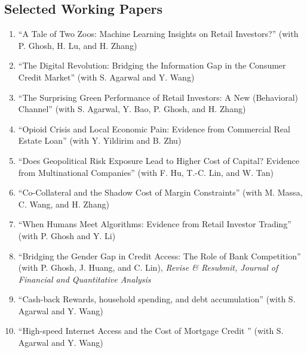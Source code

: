 \documentclass[margin,line]{res}
\begin{document}
\begin{resume}
\section{\sc Selected Working Papers}
\begin{enumerate}
\item ``A Tale of Two Zoos: Machine Learning Insights on Retail Investors?'' (with P. Ghosh, H. Lu, and H. Zhang)
\vspace*{0.1cm}

\item %
``The Digital Revolution: Bridging the Information Gap in the Consumer Credit Market'' (with S. Agarwal and Y. Wang)
\vspace*{0.1cm}

\item %
``The Surprising Green Performance of Retail Investors: A New (Behavioral) Channel'' (with S. Agarwal, Y. Bao, P. Ghosh, and H. Zhang)
\vspace*{0.1cm}
\item ``Opioid Crisis and Local Economic Pain: Evidence from Commercial Real Estate Loan'' (with Y. Yildirim and B. Zhu)
\vspace*{0.1cm}
\item %
``Does Geopolitical Risk Exposure Lead to Higher Cost of Capital? Evidence from Multinational Companies'' (with F. Hu, T.-C. Lin, and W. Tan)
\vspace*{0.1cm}
\item %
``Co-Collateral and the Shadow Cost of Margin Constraints'' (with M. Massa, C. Wang, and H. Zhang)
\vspace*{0.1cm}

\iffalse
\item %
``When Humans Meet Algorithms: Evidence from Retail Investor Trading'' (with P. Ghosh and Y. Li)
\vspace*{0.2cm}
\item %
``Bridging the Gender Gap in Credit Access: The Role of Bank Competition'' (with P. Ghosh, J. Huang, and C. Lin), \textit{Revise \& Resubmit, Journal of Financial and Quantitative Analysis}

\vspace*{0.2cm}
\item ``Cash-back Rewards, household spending, and debt accumulation'' (with S. Agarwal and Y. Wang)
 

\item %
``High-speed Internet Access and the Cost of Mortgage Credit '' (with S. Agarwal and Y. Wang)
\vspace*{0.2cm}



\end{enumerate}
\end{resume}
\end{document}
